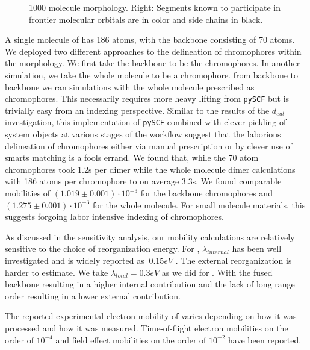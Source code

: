 \begin{figure}
\begin{subfigure}{.5\textwidth}
\end{subfigure}
\caption{1000 molecule  morphology. Right: Segments known to participate in frontier
    molecular orbitals are in color and side chains in black.}
\label{ITIC}
\end{figure}

A single molecule of  has 186 atoms, with the backbone consisting of 70 atoms. We deployed two different
approaches to the delineation of chromophores within the  morphology. 
We first take the backbone to be the chromophores. In another simulation, we
take the whole molecule to be a chromophore. 
from backbone to backbone we ran simulations with the whole molecule prescribed as chromophores. This
necessarily requires more heavy lifting from \texttt{pySCF} but is trivially easy from an indexing perspective.
Similar to the results of the $d_{cut}$ investigation, 
this implementation of \texttt{pySCF} combined with clever pickling of system objects at various stages
of the workflow suggest that the laborious delineation of chromophores either via manual prescription or
by clever use of smarts matching is a fools errand. We found that, while the 70
atom chromophores took 1.2s
per dimer while the whole molecule dimer calculations with 186 atoms per chromophore to on average 3.3s.
We found comparable mobilities of $(1.019 \pm 0.001)\cdot 10^{-3}$ for the backbone chromophores and 
$(1.275 \pm 0.001)\cdot 10^{-3}$ for the whole molecule. 
For small molecule materials, this suggests forgoing labor intensive indexing of chromophores.

As discussed in the sensitivity analysis, our mobility calculations are relatively sensitive to the choice of
reorganization energy. For , $\lambda_{internal}$ has been well investigated and is widely reported as
$~0.15eV$ \cite{Han2019}. The external reorganization is harder to estimate. We take $\lambda_{total}=0.3eV$ as we did for
. With the fused
backbone resulting in a higher internal contribution and the lack of long range order resulting in a lower
external contribution. 

The reported experimental electron mobility of  varies depending on how it was processed and how it was measured. 
Time-of-flight electron mobilities on the order of $10^{-4}$ \cite{Mica2018} and field effect mobilities on the order of
$10^{-2}$ \cite{Park2018} have been reported. 


